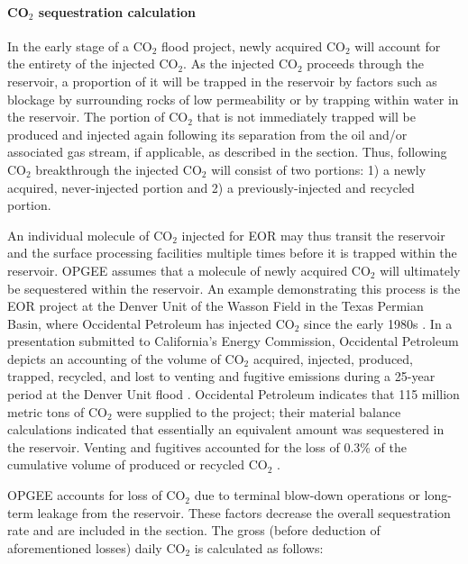 \documentclass[11pt]{report}
\begin{document}
\paragraph{CO$_2$ sequestration calculation} \label{par:IntroSeq}
In the early stage of a CO$_2$ flood project, newly acquired CO$_2$ will account for the entirety of the injected CO$_2$. As the injected CO$_2$ proceeds through the reservoir, a proportion of it will be trapped in the reservoir by factors such as blockage by surrounding rocks of low permeability or by trapping within water in the reservoir. The portion of CO$_2$ that is not immediately trapped will be produced and injected again following its separation from the oil and/or associated gas stream, if applicable, as described in the  section. Thus, following CO$_2$ breakthrough the injected CO$_2$ will consist of two portions: 1) a newly acquired, never-injected portion and 2) a previously-injected and recycled portion. 

An individual molecule of CO$_2$ injected for EOR may thus transit the reservoir and the surface processing facilities multiple times before it is trapped within the reservoir. OPGEE assumes that a molecule of newly acquired CO$_2$ will ultimately be sequestered within the reservoir. An example demonstrating this process is the EOR project at the Denver Unit of the Wasson Field in the Texas Permian Basin, where Occidental Petroleum has injected CO$_2$ since the early 1980s \cite{Oxy2015}. In a presentation submitted to California's Energy Commission, Occidental Petroleum depicts an accounting of the volume of CO$_2$ acquired, injected, produced, trapped, recycled, and lost to venting and fugitive emissions during a 25-year period at the Denver Unit flood \cite{Oxy2012}. Occidental Petroleum indicates that 115 million metric tons of CO$_2$ were supplied to the project; their material balance calculations indicated that essentially an equivalent amount was sequestered in the reservoir. Venting and fugitives accounted for the loss of 0.3\% of the cumulative volume of produced or recycled CO$_2$ \cite{Oxy2012}. 

OPGEE accounts for loss of CO$_2$ due to terminal blow-down operations or long-term leakage from the reservoir. These factors decrease the overall sequestration rate and are included in the  section. The gross (before deduction of aforementioned losses) daily CO$_2$ is calculated as follows:
\end{document}
